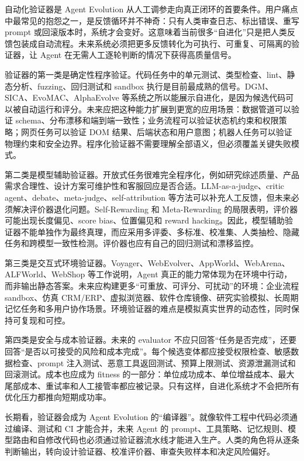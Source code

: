 自动化验证器是 Agent Evolution 从人工调参走向真正闭环的首要条件。用户痛点中最常见的抱怨之一，是反馈循环并不神奇：只有人类审查日志、标出错误、重写 prompt 或回滚版本时，系统才会变好。这意味着当前很多``自进化''只是把人类反馈包装成自动流程。未来系统必须把更多反馈转化为可执行、可重复、可隔离的验证器，让 Agent 在无需人工逐轮判断的情况下获得高质量信号。

验证器的第一类是确定性程序验证。代码任务中的单元测试、类型检查、lint、静态分析、fuzzing、回归测试和 sandbox 执行是目前最成熟的信号。DGM、SICA、EvoMAC、AlphaEvolve 等系统之所以能展示自进化，是因为候选代码可以被自动运行和评分。未来应把这种能力扩展到更宽的应用场景：数据管道可以验证 schema、分布漂移和端到端一致性；业务流程可以验证状态机约束和权限策略；网页任务可以验证 DOM 结果、后端状态和用户意图；机器人任务可以验证物理约束和安全边界。程序化验证器不需要理解全部语义，但必须覆盖关键失败模式。

第二类是模型辅助验证器。开放式任务很难完全程序化，例如研究综述质量、产品需求合理性、设计方案可维护性和客服回应是否合适。LLM-as-a-judge、critic agent、debate、meta-judge、self-attribution 等方法可以补充人工反馈，但未来必须解决评价器退化问题。Self-Rewarding 和 Meta-Rewarding 的局限表明，评价器可能出现长度偏见、score bias、位置偏见和 reward hacking。因此，模型辅助验证器不能单独作为最终真理，而应采用多评委、多标准、校准集、人类抽检、隐藏任务和跨模型一致性检测。评价器也应有自己的回归测试和漂移监控。

第三类是交互式环境验证器。Voyager、WebEvolver、AppWorld、WebArena、ALFWorld、WebShop 等工作说明，Agent 真正的能力常体现为在环境中行动，而非输出静态答案。未来应构建更多``可重放、可评分、可扰动''的环境：企业流程 sandbox、仿真 CRM/ERP、虚拟浏览器、软件仓库镜像、研究实验模拟、长周期记忆任务和多用户协作场景。环境验证器的难点是模拟真实世界的动态性，同时保持可复现和可控。

第四类是安全与成本验证器。未来的 evaluator 不应只回答``任务是否完成''，还要回答``是否以可接受的风险和成本完成''。每个候选变体都应接受权限检查、敏感数据检查、prompt 注入测试、恶意工具返回测试、预算上限测试、资源泄漏测试和回滚测试。成本也应成为 fitness 的一部分：单位成功成本、单位增益成本、最大尾部成本、重试率和人工接管率都应被记录。只有这样，自进化系统才不会把所有优化压力都推向短期成功率。

长期看，验证器会成为 Agent Evolution 的``编译器''。就像软件工程中代码必须通过编译、测试和 CI 才能合并，未来 Agent 的 prompt、工具策略、记忆规则、模型路由和自修改代码也必须通过验证器流水线才能进入生产。人类的角色将从逐条判断输出，转向设计验证器、校准评价器、审查失败样本和决定风险偏好。

